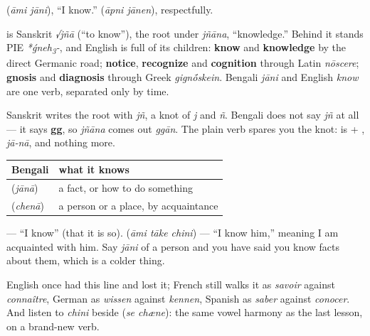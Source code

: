   (\emph{āmi jāni}), \textquotedblleft{}I know.\textquotedblright{}   (\emph{āpni jānen}), respectfully.

\begin{cousinweb}
\textbf{} is Sanskrit \emph{√jñā} (\textquotedblleft{}to know\textquotedblright{}), the root under \emph{jñāna}, \textquotedblleft{}knowledge.\textquotedblright{} Behind it stands PIE \emph{*ǵneh\textsubscript{3}-}, and English is full of its children: \textbf{know} and \textbf{knowledge} by the direct Germanic road; \textbf{notice}, \textbf{recognize} and \textbf{cognition} through Latin \emph{nōscere}; \textbf{gnosis} and \textbf{diagnosis} through Greek \emph{gign\'{\={o}}skein}. Bengali \emph{jāni} and English \emph{know} are one verb, separated only by time.
\end{cousinweb}

\begin{sounds}
Sanskrit writes the root with \emph{jñ}, a knot of \emph{j} and \emph{ñ}. Bengali does not say \emph{jñ} at all — it says \textbf{gg}, so \emph{jñāna} comes out \emph{ggān}. The plain verb spares you the knot: \textbf{} is  + , \emph{jā-nā}, and nothing more.
\end{sounds}

\begin{grammarlens}[title={Grammar Lens: two knowings, and English has one word for both}]
\noindent
\begin{tabularx}{\linewidth}{@{}>{\raggedright\arraybackslash}X>{\raggedright\arraybackslash}X@{}}
\toprule
\textbf{Bengali} & \textbf{what it knows} \\
\midrule
\bn{জানা} (\emph{jānā}) & a fact, or how to do something \\
\bn{চেনা} (\emph{chenā}) & a person or a place, by acquaintance \\
\bottomrule
\end{tabularx}

  — \textquotedblleft{}I know\textquotedblright{} (that it is so).    (\emph{āmi tāke chini}) — \textquotedblleft{}I know him,\textquotedblright{} meaning I am acquainted with him. Say \emph{jāni} of a person and you have said you know facts about them, which is a colder thing.

English once had this line and lost it; French still walks it as \emph{savoir} against \emph{connaître}, German as \emph{wissen} against \emph{kennen}, Spanish as \emph{saber} against \emph{conocer}. And listen to \emph{chini} beside   (\emph{se chæne}): the same vowel harmony as the last lesson, on a brand-new verb.
\end{grammarlens}

